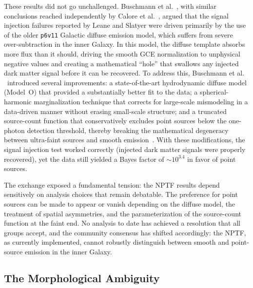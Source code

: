 These results did not go unchallenged.
Buschmann et al.~\cite{Buschmann:2020adf}, with similar conclusions reached independently by Calore et al.~\cite{Calore:2021jvg}, argued that the signal injection failures reported by Leane and Slatyer were driven primarily by the use of the older \texttt{p6v11} Galactic diffuse emission model, which suffers from severe over-subtraction in the inner Galaxy.
In this model, the diffuse template absorbs more flux than it should, driving the smooth GCE normalization to unphysical negative values and creating a mathematical ``hole'' that swallows any injected dark matter signal before it can be recovered.
To address this, Buschmann et al.
\ introduced several improvements: a state-of-the-art hydrodynamic diffuse model (Model~O) that provided a substantially better fit to the data; a spherical-harmonic marginalization technique that corrects for large-scale mismodeling in a data-driven manner without erasing small-scale structure; and a truncated source-count function that conservatively excludes point sources below the one-photon detection threshold, thereby breaking the mathematical degeneracy between ultra-faint sources and smooth emission~\cite{Chang:2019ars}.
With these modifications, the signal injection test worked correctly (injected dark matter signals were properly recovered), yet the data still yielded a Bayes factor of $\sim 10^{3.4}$ in favor of point sources.

The exchange exposed a fundamental tension: the NPTF results depend sensitively on analysis choices that remain debatable.
The preference for point sources can be made to appear or vanish depending on the diffuse model, the treatment of spatial asymmetries, and the parameterization of the source-count function at the faint end.
No analysis to date has achieved a resolution that all groups accept, and the community consensus has shifted accordingly: the NPTF, as currently implemented, cannot robustly distinguish between smooth and point-source emission in the inner Galaxy.

\subsection{The Morphological Ambiguity}
\label{sec:4.4.2}


